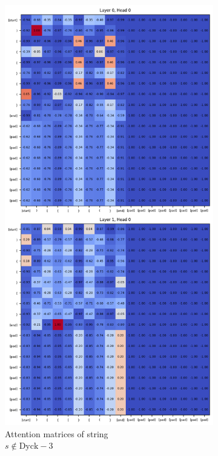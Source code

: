 \begin{figure}[h]
    \centering
    \begin{subfigure}{.5\textwidth}
      \centering
      \includegraphics[width=.8\linewidth]{docs/figs/dyck_3/pad_tok_seq_1_dyck_3.png}
      \caption{Attention matrices of string \\ $s \notin \text{Dyck}-3$}
      \label{fig:neg-dyck-3}
    \end{subfigure}%
    \begin{subfigure}{.5\textwidth}
      \centering

\end{subfigure}
\end{figure}
